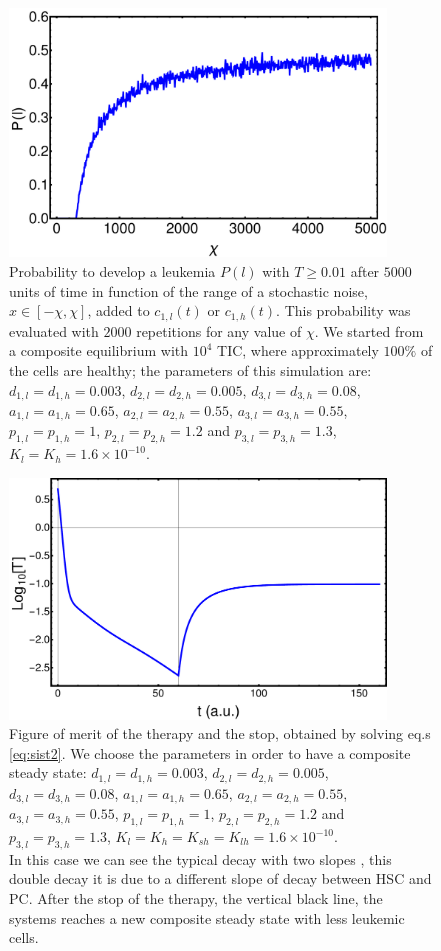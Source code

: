 \documentclass[a4paper,10pt]{article}
\begin{document}
\begin{figure}
\centering
\includegraphics[width=10cm] {leucemia-e-fluttuazioni.pdf}
\caption{Probability to develop a leukemia $P(l)$ with $T\geq0.01$ after
$5000$ units of time in function of the range of a stochastic noise, $x\in[-\chi,\chi]$,
added to $c_{1,l}(t)$ or $c_{1,h}(t)$. This probability was evaluated with $2000$ repetitions for any value of $\chi$.
We started from a composite equilibrium with $10^4$ TIC, where approximately $ 100\%$ of the
cells are healthy;
the parameters of this simulation are: 
$d_{1,l}=d_{1,h}=0.003$, $d_{2,l}=d_{2,h}=0.005$,
$d_{3,l}=d_{3,h}=0.08$, $a_{1,l}=a_{1,h}=0.65$, $a_{2,l}=a_{2,h}=0.55$, 
$a_{3,l}=a_{3,h}=0.55$, $p_{1,l}=p_{1,h}=1$, $p_{2,l}=p_{2,h}=1.2$ and
$p_{3,l}=p_{3,h}=1.3$, $K_{l}=K_{h}=1.6\times 10^{-10}$.\\
}
\label{fig:P-fluctuations}
\end{figure}


\begin{figure}
\centering
\includegraphics[width=10cm ]{stop-composite.pdf}
\caption{Figure of merit  of the therapy and the stop, obtained by
solving eq.s \eqref{eq:sist2}.
We choose the parameters in order to have a 
composite steady state: 
$d_{1,l}=d_{1,h}=0.003$, $d_{2,l}=d_{2,h}=0.005$,
$d_{3,l}=d_{3,h}=0.08$, $a_{1,l}=a_{1,h}=0.65$,  $a_{2,l}=a_{2,h}=0.55$,  
$a_{3,l}=a_{3,h}=0.55$, $p_{1,l}=p_{1,h}=1$, $p_{2,l}=p_{2,h}=1.2$ and
$p_{3,l}=p_{3,h}=1.3$, $K_{l}=K_{h}=K_{sh}=K_{lh}=1.6\times 10^{-10}$.\\
In this case we can see the typical decay with two slopes \cite{michor2005}, 
this double decay it is due to a different slope of decay between HSC and PC.
After the stop of the therapy, the vertical black line,
 the systems reaches a new composite steady state with less leukemic cells.}
\label{fig:stop-composite}
\end{figure}
\end{document}
